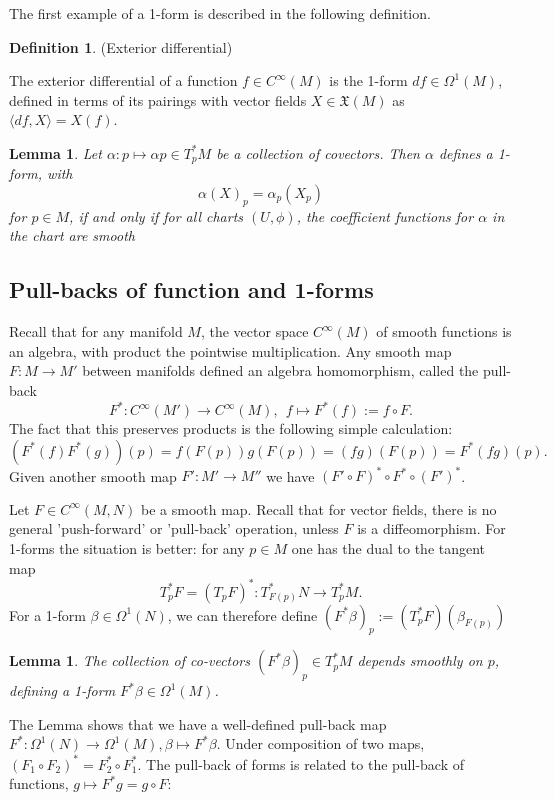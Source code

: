 \documentclass{article}
\newtheorem{lemma}[theorem]{Lemma}
\theoremstyle{definition}
\newtheorem{defn}[theorem]{Definition}
\newenvironment{definition}
  {\vspace{8pt}\begin{mdframed}[backgroundcolor=blueish]\begin{defn}}
  {\end{defn}\end{mdframed}\vspace{4pt}}
\begin{document}
The first example of a 1-form is described in the following definition.

\begin{definition} (Exterior differential)

The exterior differential of a function $f \in C^\infty(M)$ is the 1-form $d f \in \Omega^1 (M)$, defined in terms of its pairings with vector fields $X \in \mathfrak X(M)$ as $\langle d f, X\rangle = X(f)$.
\end{definition}


\begin{lemma}
Let $\alpha : p \mapsto \alpha p \in T^*_p M$ be a collection of covectors. Then $\alpha$ defines a 1-form, with 
\[
    \alpha(X)_p = \alpha_p(X_p)
\]
for $p \in M$, if and only if for all charts $(U,\phi)$, the coefficient functions for $\alpha$ in the chart are smooth
\end{lemma}

\subsection{Pull-backs of function and 1-forms}

Recall that for any manifold $M$, the vector space $C^\infty(M)$ of smooth functions is an algebra, with product the pointwise multiplication. Any smooth map $F : M \rightarrow M'$ between manifolds defined an algebra homomorphism, called the pull-back
\[
    F^* : C^\infty (M') \rightarrow C^\infty (M), \ \ f \mapsto F ^* (f) := f \circ F. 
\]
The fact that this preserves products is the following simple calculation: 
\[
(F^* (f)F^* (g))(p) = f(F(p))g(F(p)) = (f g)(F(p)) = F^* (f g)(p).
\]
Given another smooth map $F' : M' \rightarrow M''$ we have $(F'\circ F)^* \circ F^* \circ (F' )^*$.

Let $F \in C^\infty(M,N)$ be a smooth map. Recall that for vector fields, there is no general 'push-forward' or 'pull-back' operation, unless $F$ is a diffeomorphism. For 1-forms the situation is better: for any $p \in M$ one has the dual to the tangent map 
\[
    T^*_p F = (T_pF)^* : T^*_{F(p)}N \rightarrow T^*_p M.
\]
For a 1-form $\beta \in \Omega^1 (N)$, we can therefore define $(F^* \beta)_p := (T^*_p F)(\beta_{F(p)})$

\begin{lemma}
The collection of co-vectors $(F^*\beta)_p \in T^*_p M$ depends smoothly on $p$, defining a 1-form $F^*\beta \in \Omega^1 (M)$.
\end{lemma}

The Lemma shows that we have a well-defined pull-back map $F^* : \Omega^1 (N) \rightarrow \Omega^1  (M), \beta \mapsto F^* \beta$. Under composition of two maps, $(F_1 \circ F_2)^* = F^*_2 \circ F^*_1 $. The pull-back of forms is related to the pull-back of functions, $g \mapsto F^*g = g \circ F$:
\end{document}

